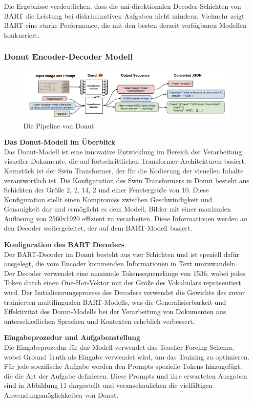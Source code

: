 \documentclass[12pt,a4paper,twoside]{article}
\begin{document}
Die Ergebnisse verdeutlichen, dass die uni-direktionalen Decoder-Schichten von BART die Leistung bei diskriminativen Aufgaben nicht mindern. Vielmehr zeigt BART eine starke Performance, die mit den besten derzeit verfügbaren Modellen konkurriert.


\subsubsection{Donut Encoder-Decoder Modell}

\begin{figure}[H]
\centering
\includegraphics[width=0.6\linewidth]{DONUT-Input-Output.png}
\caption{Die Pipeline von Donut}
\label{fig:2}
\end{figure}

\textbf{Das Donut-Modell im Überblick}\\
Das Donut-Modell ist eine innovative Entwicklung im Bereich der Verarbeitung visueller Dokumente, die auf fortschrittlichen Transformer-Architekturen basiert. Kernstück ist der Swin Transformer, der für die Kodierung der visuellen Inhalte verantwortlich ist. Die Konfiguration des Swin Transformers in Donut besteht aus Schichten der Größe 2, 2, 14, 2 und einer Fenstergröße von 10. Diese Konfiguration stellt einen Kompromiss zwischen Geschwindigkeit und Genauigkeit dar und ermöglicht es dem Modell, Bilder mit einer maximalen Auflösung von 2560x1920 effizient zu verarbeiten. Diese Informationen werden an den Decoder weitergeleitet, der auf dem BART-Modell basiert.

\textbf{Konfiguration des BART Decoders}\\
Der BART-Decoder im Donut besteht aus vier Schichten und ist speziell dafür ausgelegt, die vom Encoder kommenden Informationen in Text umzuwandeln. Der Decoder verwendet eine maximale Tokensequenzlänge von 1536, wobei jedes Token durch einen One-Hot-Vektor mit der Größe des Vokabulars repräsentiert wird. Der Initialisierungsprozess des Decoders verwendet die Gewichte des zuvor trainierten multilingualen BART-Modells, was die Generalisierbarkeit und Effektivität des Donut-Modells bei der Verarbeitung von Dokumenten aus unterschiedlichen Sprachen und Kontexten erheblich verbessert.

\textbf{Eingabeprozedur und Aufgabenstellung}\\
Die Eingabeprozedur für das Modell verwendet das Teacher Forcing Schema, wobei Ground Truth als Eingabe verwendet wird, um das Training zu optimieren. Für jede spezifische Aufgabe werden den Prompts spezielle Tokens hinzugefügt, die die Art der Aufgabe definieren. Diese Prompts und ihre erwarteten Ausgaben sind in Abbildung 11 dargestellt und veranschaulichen die vielfältigen Anwendungsmöglichkeiten von Donut.
\end{document}
